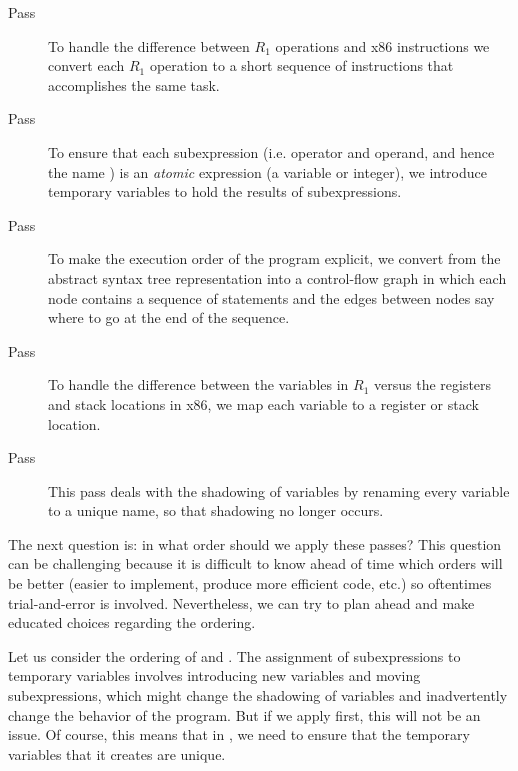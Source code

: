 \documentclass[11pt]{book}
\begin{document}
\begin{description}
\item[Pass ] To handle the difference between
  $R_1$ operations and x86 instructions we convert each $R_1$
  operation to a short sequence of instructions that accomplishes the
  same task.

\item[Pass ] To ensure that each
  subexpression (i.e. operator and operand, and hence the name
  ) is an \emph{atomic} expression (a variable or
  integer), we introduce temporary variables to hold the results
  of subexpressions.
  
\item[Pass ] To make the execution order of the
  program explicit, we convert from the abstract syntax tree
  representation into a control-flow graph in which each node
  contains a sequence of statements and the edges between nodes say
  where to go at the end of the sequence.

\item[Pass ] To handle the difference between the
  variables in $R_1$ versus the registers and stack locations in x86,
  we map each variable to a register or stack location.

\item[Pass ] This pass deals with the shadowing of variables
  by renaming every variable to a unique name, so that shadowing no
  longer occurs.
\end{description}

The next question is: in what order should we apply these passes? This
question can be challenging because it is difficult to know ahead of
time which orders will be better (easier to implement, produce more
efficient code, etc.) so oftentimes trial-and-error is
involved. Nevertheless, we can try to plan ahead and make educated
choices regarding the ordering.

Let us consider the ordering of  and
. The assignment of subexpressions to
temporary variables involves introducing new variables and moving
subexpressions, which might change the shadowing of variables and
inadvertently change the behavior of the program.  But if we apply
 first, this will not be an issue. Of course, this means
that in , we need to ensure that the
temporary variables that it creates are unique.
\end{document}
